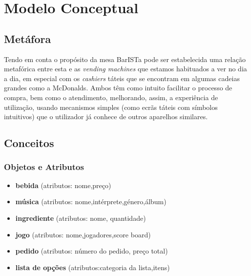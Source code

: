 \documentclass{article}
\begin{document}
\section*{Modelo Conceptual}



\subsection*{Metáfora}
 Tendo em conta o propósito da mesa BarISTa pode ser estabelecida uma relação metafórica entre esta e as \textit{vending machines} que estamos habituados a ver no dia a dia, em especial com os \textit{cashiers} táteis que se encontram em algumas cadeias grandes como a McDonalds. Ambos têm como intuito facilitar o processo de compra, bem como o atendimento, melhorando, assim, a experiência de utilização, usando mecanismos simples (como ecrãs táteis com símbolos intuitivos) que o utilizador já conhece de outros aparelhos similares.

\subsection*{Conceitos}
\subsubsection*{Objetos e Atributos}
\begin{itemize}
\item\textbf{bebida} (atributos: nome,preço)
\item\textbf{música} (atributos: nome,intérprete,género,álbum)
\item\textbf{ingrediente} (atributos: nome, quantidade)
\item\textbf{jogo} (atributos: nome,jogadores,score board)
\item\textbf{pedido} (atributos: número do pedido, preço total)
\item\textbf{lista de opções} (atributos:categoria da lista,itens)
\end{itemize}
\end{document}
